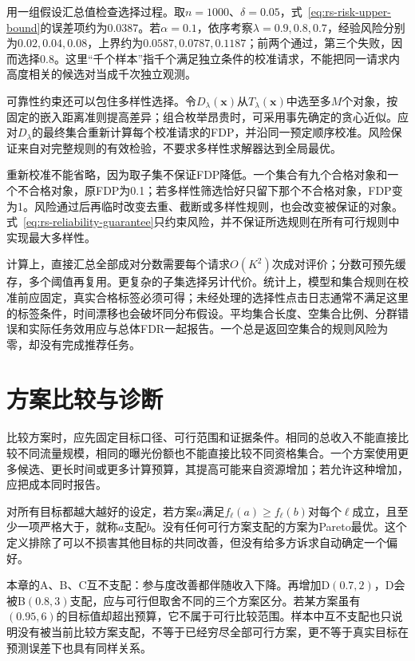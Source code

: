 用一组假设汇总值检查选择过程。取$n=1000$、$\delta=0.05$，式~\eqref{eq:rs-risk-upper-bound}的误差项约为0.0387。若$\alpha=0.1$，依序考察$\lambda=0.9,0.8,0.7$，经验风险分别为$0.02,0.04,0.08$，上界约为$0.0587,0.0787,0.1187$；前两个通过，第三个失败，因而选择0.8。这里“千个样本”指千个满足独立条件的校准请求，不能把同一请求内高度相关的候选对当成千次独立观测。

可靠性约束还可以包住多样性选择。令$D_\lambda(\bm{x})$从$T_\lambda(\bm{x})$中选至多$M$个对象，按固定的嵌入距离准则提高差异；组合枚举昂贵时，可采用事先确定的贪心近似。应对$D_\lambda$的最终集合重新计算每个校准请求的FDP，并沿同一预定顺序校准。风险保证来自对完整规则的有效检验，不要求多样性求解器达到全局最优。

重新校准不能省略，因为取子集不保证FDP降低。一个集合有九个合格对象和一个不合格对象，原FDP为0.1；若多样性筛选恰好只留下那个不合格对象，FDP变为1。风险通过后再临时改变去重、截断或多样性规则，也会改变被保证的对象。式~\eqref{eq:rs-reliability-guarantee}只约束风险，并不保证所选规则在所有可行规则中实现最大多样性。

计算上，直接汇总全部成对分数需要每个请求$O(K^2)$次成对评价；分数可预先缓存，多个阈值再复用。更复杂的子集选择另计代价。统计上，模型和集合规则在校准前应固定，真实合格标签必须可得；未经处理的选择性点击日志通常不满足这里的标签条件，时间漂移也会破坏同分布假设。平均集合长度、空集合比例、分群错误和实际任务效用应与总体FDR一起报告。一个总是返回空集合的规则风险为零，却没有完成推荐任务。

\section{方案比较与诊断}
\label{sec:rs-decision-diagnostics}

比较方案时，应先固定目标口径、可行范围和证据条件。相同的总收入不能直接比较不同流量规模，相同的曝光份额也不能直接比较不同资格集合。一个方案使用更多候选、更长时间或更多计算预算，其提高可能来自资源增加；若允许这种增加，应把成本同时报告。

对所有目标都越大越好的设定，若方案$a$满足$f_\ell(a)\geq f_\ell(b)$对每个$\ell$成立，且至少一项严格大于，就称$a$支配$b$。没有任何可行方案支配的方案为Pareto最优。这个定义排除了可以不损害其他目标的共同改善，但没有给多方诉求自动确定一个偏好。

本章的A、B、C互不支配：参与度改善都伴随收入下降。再增加D$(0.7,2)$，D会被B$(0.8,3)$支配，应与可行但取舍不同的三个方案区分。若某方案虽有$(0.95,6)$的目标值却超出预算，它不属于可行比较范围。样本中互不支配也只说明没有被当前比较方案支配，不等于已经穷尽全部可行方案，更不等于真实目标在预测误差下也具有同样关系。

